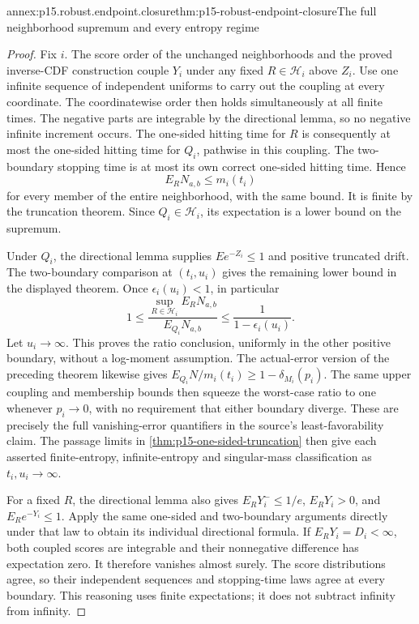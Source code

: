 \begin{annexitem}{annex:p15.robust.endpoint.closure}{thm:p15-robust-endpoint-closure}{The full neighborhood supremum and every entropy regime}
\begin{proof}
Fix \(i\). The score order of the unchanged neighborhoods and the
proved inverse-CDF construction couple \(Y_i\) under any fixed
\(R\in\mathcal H_i\) above \(Z_i\).
Use one infinite sequence of independent uniforms to carry out the
coupling at every coordinate. The coordinatewise order then holds
simultaneously at all finite times. The negative parts are integrable
by the directional lemma, so no negative infinite increment occurs.
The one-sided hitting time for \(R\) is consequently at most the
one-sided hitting time for \(Q_i\), pathwise in this coupling.
The two-boundary stopping time is at most its own correct one-sided
hitting time. Hence
\[
 E_RN_{a,b}\leq m_i(t_i)
\]
for every member of the entire neighborhood, with the same bound.
It is finite by the truncation theorem.
Since \(Q_i\in\mathcal H_i\), its expectation is a lower bound on
the supremum.

Under \(Q_i\), the directional lemma supplies
\(Ee^{-Z_i}\leq1\) and positive truncated drift.
The two-boundary comparison at \((t_i,u_i)\) gives the remaining
lower bound in the displayed theorem. Once \(\epsilon_i(u_i)<1\),
in particular
\[
 1\leq
 \frac{\sup_{R\in\mathcal H_i}E_RN_{a,b}}{E_{Q_i}N_{a,b}}
 \leq\frac1{1-\epsilon_i(u_i)}.
\]
Let \(u_i\to\infty\). This proves the ratio conclusion, uniformly in
the other positive boundary, without a log-moment assumption.
The actual-error version of the preceding theorem likewise gives
\(E_{Q_i}N/m_i(t_i)\geq1-\delta_{M_i}(p_i)\).
The same upper coupling and membership bounds then squeeze the
worst-case ratio to one whenever \(p_i\to0\), with no requirement
that either boundary diverge. These are precisely the full
vanishing-error quantifiers in the source's least-favorability claim.
The passage limits in \cref{thm:p15-one-sided-truncation} then give
each asserted finite-entropy, infinite-entropy and singular-mass
classification as \(t_i,u_i\to\infty\).

For a fixed \(R\), the directional lemma also gives
\(E_RY_i^-\leq1/e\), \(E_RY_i>0\), and \(E_Re^{-Y_i}\leq1\).
Apply the same one-sided and two-boundary arguments directly under
that law to obtain its individual directional formula.
If \(E_RY_i=D_i<\infty\), both coupled scores are integrable and
their nonnegative difference has expectation zero. It therefore
vanishes almost surely. The score distributions agree, so their
independent sequences and stopping-time laws agree at every boundary.
This reasoning uses finite expectations; it does not subtract
infinity from infinity.
\end{proof}
\end{annexitem}

